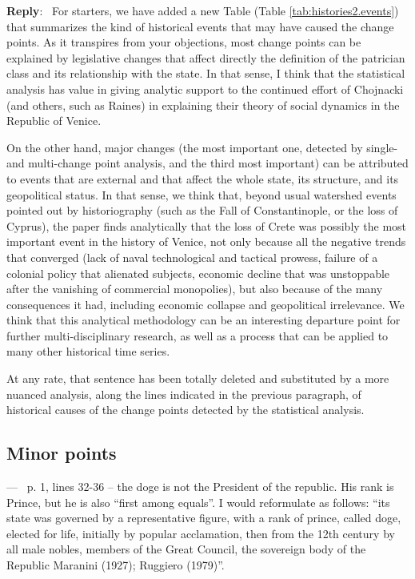 \documentclass[11pt]{article}
\newcounter{reviewer}
\newcounter{point}[reviewer]
\renewcommand{\thepoint}{P\,\thereviewer.\arabic{point}}
\newenvironment{point}
   {\refstepcounter{point} \bigskip \noindent {\textbf{Reviewer~Point~\thepoint} } ---\ }
   {\par }
\newenvironment{reply}
   {\medskip \noindent \begin{sf}\textbf{Reply}:\  }
   {\medskip \end{sf}}
\begin{document}
\begin{reply}
  For starters, we have added a new Table (Table \ref{tab:histories2.events}) that summarizes the kind of
  historical events that may have caused the change points. As it transpires
  from your objections, most change points can be explained by legislative
  changes that affect directly the definition of the patrician class and its
  relationship with the state. In that sense, I think that the statistical
  analysis has value in giving analytic support to the continued effort of
  Chojnacki (and others, such as Raines) in explaining their theory of social
  dynamics in the Republic of Venice.

  On the other hand, major changes (the most important one, detected by single-
  and multi-change point analysis, and the third most important) can be
  attributed to events that are external and that affect the whole state, its
  structure, and its geopolitical status. In that sense, we think that, beyond
  usual watershed events pointed out by historiography (such as the Fall of
  Constantinople, or the loss of Cyprus), the paper finds analytically that the
  loss of Crete was possibly the most important event in the history of Venice,
  not only because all the negative trends that converged (lack of naval technological
  and tactical prowess, failure of a colonial policy that alienated subjects,
  economic decline that was unstoppable after the vanishing of commercial
  monopolies), but also because of the many consequences it had, including
  economic collapse and geopolitical irrelevance. We think that this analytical
  methodology can be an interesting departure point for further
  multi-disciplinary research, as well as a process that can be applied to many
  other historical time series.

  At any rate, that sentence has been totally deleted and substituted by a more
  nuanced analysis, along the lines indicated in the previous paragraph, of
  historical causes of the change points detected by the statistical analysis.
\end{reply}

\subsection{Minor points}

\begin{point}
  p. 1, lines 32-36 – the doge is not the President of the republic. His rank is Prince, but he is also “first among equals”. I would reformulate as follows: “its state was governed by a representative figure, with a rank of prince, called doge, elected for life, initially by popular acclamation, then from the 12th century by all male nobles, members of the Great Council, the sovereign body of the Republic Maranini (1927); Ruggiero (1979)”.
	\label{pt:m:1}
      \end{point}
\end{document}
